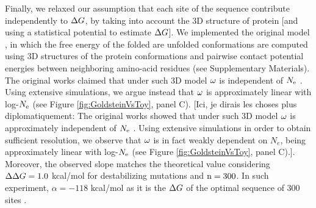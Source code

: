 \documentclass{article}
\begin{document}
	Finally, we relaxed our assumption that each site of the sequence contribute independently to $\Delta G$, by taking into account the $3$D structure of protein [and using a statistical potential to estimate $\Delta G$].
	We implemented the original model \cite{Williams2006, Goldstein2011, Pollock2012}, in which the free energy of the folded are unfolded conformations are computed using $3$D structures of the protein conformations and pairwise contact potential energies between neighboring amino-acid residues \cite{Miyazawa1985} (see Supplementary Materials).
	The original works claimed that under such $3$D model $\omega$ is independent of $N_{\mathrm{e}}$ \cite{Goldstein2013}.
	Using extensive simulations, we argue instead that $\omega$ is approximately linear with log-$N_{\mathrm{e}}$ (see Figure \ref{fig:GoldsteinVsToy}, panel C).
	[Ici, je dirais les choses plus diplomatiquement:
	The original works showed that under such $3$D model $\omega$ is approximately independent of $N_{\mathrm{e}}$ \cite{Goldstein2013}.
	Using extensive simulations in order to obtain sufficient resolution, we observe that $\omega$ is in fact weakly dependent on $N_e$, being approximately linear with log-$N_{\mathrm{e}}$ (see Figure \ref{fig:GoldsteinVsToy}, panel C).]. 
	Moreover, the observed slope matches the theoretical value considering $\Delta \Delta G = 1.0$ kcal/mol for destabilizing mutations and $\text{n}=300$. 
	In such experiment, $\alpha=-118$ kcal/mol as it is the $\Delta G$ of the optimal sequence of $300$ sites \cite{Goldstein2011}.
\end{document}
